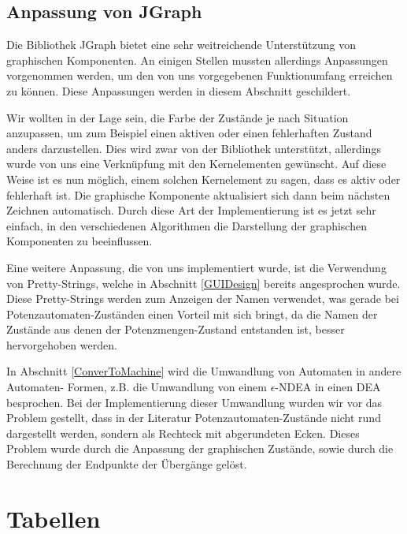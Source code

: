 \subsection{Anpassung von JGraph}\label{GraphJGraphAdaptation}

Die Bibliothek JGraph bietet eine sehr weitreichende Unterstützung von
graphischen Komponenten. An einigen Stellen mussten allerdings Anpassungen
vorgenommen werden, um den von uns vorgegebenen Funktionumfang erreichen zu
können. Diese Anpassungen werden in diesem Abschnitt geschildert.\vspace{10pt}

Wir wollten in der Lage sein, die Farbe der Zustände je nach Situation
anzupassen, um zum Beispiel einen aktiven oder einen fehlerhaften Zustand anders
darzustellen. Dies wird zwar von der Bibliothek unterstützt, allerdings wurde von
uns eine Verknüpfung mit den Kernelementen gewünscht. Auf diese Weise ist es nun
möglich, einem solchen Kernelement zu sagen, dass es aktiv oder fehlerhaft ist.
Die graphische Komponente aktualisiert sich dann beim nächsten Zeichnen
automatisch. Durch diese Art der Implementierung ist es jetzt sehr einfach, in
den verschiedenen Algorithmen die Darstellung der graphischen Komponenten zu
beeinflussen.\vspace{10pt}

Eine weitere Anpassung, die von uns implementiert wurde, ist die Verwendung von
Pretty-Strings, welche in Abschnitt \ref{GUIDesign} bereits angesprochen wurde.
Diese Pretty-Strings werden zum Anzeigen der Namen verwendet, was gerade bei
Potenzautomaten-Zuständen einen Vorteil mit sich bringt, da die Namen der Zustände
aus denen der Potenzmengen-Zustand entstanden ist, besser hervorgehoben
werden.\vspace{10pt}

In Abschnitt \ref{ConverToMachine} wird die Umwandlung von Automaten in andere
Automaten- Formen, z.B. die Umwandlung von einem $\epsilon$-NDEA in einen DEA
besprochen. Bei der Implementierung dieser Umwandlung wurden wir vor das Problem
gestellt, dass in der Literatur Potenzautomaten-Zustände nicht rund dargestellt
werden, sondern als Rechteck mit abgerundeten Ecken. Dieses Problem wurde durch
die Anpassung der graphischen Zustände, sowie durch die Berechnung der Endpunkte
der Übergänge gelöst.\vspace{10pt}


\section{Tabellen}\label{Tables}

